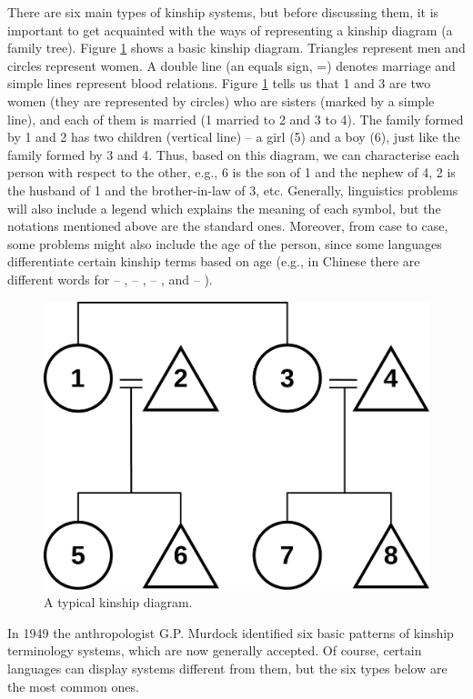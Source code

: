\begin{refsection}
There are six main types of kinship systems, but before discussing them, it is important to get acquainted with the ways of representing a kinship diagram (a family tree). Figure \ref{fig:short-kinship} shows a basic kinship diagram. Triangles represent men and circles represent women. A double line (an equals sign, =) denotes marriage and simple lines represent blood relations. Figure \ref{fig:short-kinship} tells us that 1 and 3 are two women (they are represented by circles) who are sisters (marked by a simple line), and each of them is married (1 married to 2 and 3 to 4). The family formed by 1 and 2 has two children (vertical line) – a girl (5) and a boy (6), just like the family formed by 3 and 4. Thus, based on this diagram, we can characterise each person with respect to the other, e.g., 6 is the son of 1 and the nephew of 4, 2 is the husband of 1 and the brother-in-law of 3, etc. Generally, linguistics problems will also include a legend which explains the meaning of each symbol, but the notations mentioned above are the standard ones. Moreover, from case to case, some problems might also include the age of the person, since some languages differentiate certain kinship terms based on age (e.g., in Chinese there are different words for  – {} ,  – {} ,  – {} , and  – {} ).

\begin{figure}[h]
  \includegraphics[width = 0.5\linewidth]{figures/kinship_short.pdf}
  \caption{A typical kinship diagram.}
  \label{fig:short-kinship}
\end{figure}

In 1949 the anthropologist G.P. Murdock identified six basic patterns of kinship terminology systems, which are now generally accepted. Of course, certain languages can display systems different from them, but the six types below are the most common ones. 


\end{refsection}
